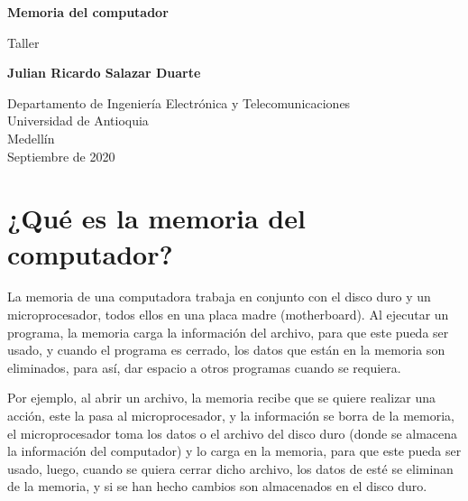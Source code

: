 \documentclass{article}
\begin{document}
\begin{titlepage}
    \begin{center}
        \vspace*{1cm}
            
        \Huge
        \textbf{Memoria del computador}
            
        \vspace{0.5cm}
        \LARGE
        Taller
            
        \vspace{1.5cm}
            
        \textbf{Julian Ricardo Salazar Duarte}
            
        \vfill
            
        \vspace{0.8cm}
            
        \Large
        Departamento de Ingeniería Electrónica y Telecomunicaciones\\
        Universidad de Antioquia\\
        Medellín\\
        Septiembre de 2020
            
    \end{center}
\end{titlepage}

\tableofcontents

\newpage

\section{¿Qué es la memoria del computador?}
La memoria de una computadora trabaja en conjunto con el disco duro y un microprocesador, todos ellos en una placa madre (motherboard). Al ejecutar un programa, la memoria carga la información del archivo, para que este pueda ser usado, y cuando el programa es cerrado, los datos que están en la memoria son eliminados, para así, dar espacio a otros programas cuando se requiera.
\vspace{0.5cm}

Por ejemplo, al abrir un archivo, la memoria recibe que se quiere realizar una acción, este la pasa al microprocesador, y la información se borra de la memoria, el microprocesador toma los datos o el archivo del disco duro (donde se almacena la información del computador) y lo carga en la memoria, para que este pueda ser usado, luego, cuando se quiera cerrar dicho archivo, los datos de esté se eliminan de la memoria, y si se han hecho cambios son almacenados en el disco duro.\cite{Salazar}
\end{document}
